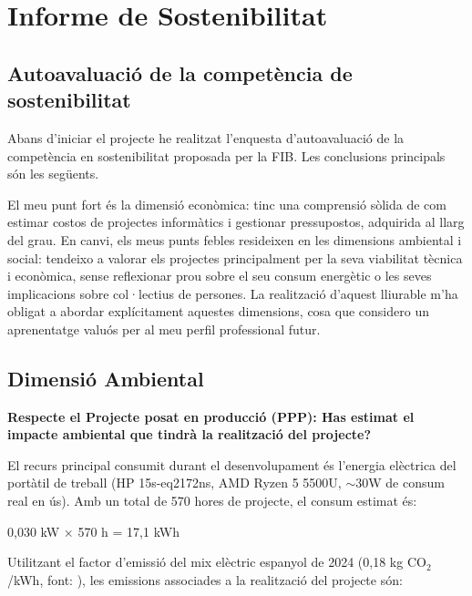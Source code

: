 \documentclass[12pt,a4paper,twoside]{report}
\begin{document}
\chapter{Informe de Sostenibilitat}
\label{chap:sostenibilitat}

\section{Autoavaluaci\'o de la compet\`encia de sostenibilitat}
\label{sec:autoavaluacio}

Abans d'iniciar el projecte he realitzat l'enquesta d'autoavaluaci\'o de la compet\`encia en sostenibilitat proposada per la FIB. Les conclusions principals s\'on les seg\"uents.

El meu punt fort \'es la dimensi\'o econ\`omica: tinc una comprensi\'o s\`olida de com estimar costos de projectes inform\`atics i gestionar pressupostos, adquirida al llarg del grau. En canvi, els meus punts febles resideixen en les dimensions ambiental i social: tendeixo a valorar els projectes principalment per la seva viabilitat t\`ecnica i econ\`omica, sense reflexionar prou sobre el seu consum energ\`etic o les seves implicacions sobre col·lectius de persones. La realitzaci\'o d'aquest lliurable m'ha obligat a abordar expl\'icitament aquestes dimensions, cosa que considero un aprenentatge valu\'os per al meu perfil professional futur.

\section{Dimensi\'o Ambiental}
\label{sec:dimensio-ambiental}

\textbf{Respecte el Projecte posat en producci\'o (PPP): \'Has estimat el impacte ambiental que tindr\`a la realitzaci\'o del projecte?}

El recurs principal consumit durant el desenvolupament \'es l'energia el\`ectrica del port\`atil de treball (HP 15s-eq2172ns, AMD Ryzen 5 5500U, $\sim$30W de consum real en \'us). Amb un total de 570 hores de projecte, el consum estimat \'es:

\begin{center}
0,030 kW $\times$ 570 h = 17,1 kWh
\end{center}

Utilitzant el factor d'emissi\'o del mix el\`ectric espanyol de 2024 (0,18 kg CO$_2$/kWh, font: \cite{ree}), les emissions associades a la realitzaci\'o del projecte s\'on:
\end{document}
